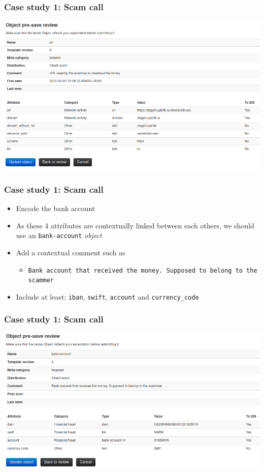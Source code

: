 \begin{frame}
    \frametitle{Case study 1: Scam call}
    \begin{center}
        \includegraphics[width=1.0\linewidth]{pictures/case1/object-url.png}
    \end{center}
\end{frame}

\begin{frame}
    \frametitle{Case study 1: Scam call}
    \begin{itemize}
        \item Encode the bank account
        \item As these 4 attributes are contextually linked between each others, we should use an \texttt{bank-account} \textit{object}
        \item Add a contextual comment such as
        \begin{itemize}
            \item \texttt{Bank account that received the money. Supposed to belong to the scammer}
        \end{itemize}
        \item Include at least: \texttt{iban}, \texttt{swift}, \texttt{account} and \texttt{currency\_code}
    \end{itemize}
\end{frame}

\begin{frame}
    \frametitle{Case study 1: Scam call}
    \begin{center}
        \includegraphics[width=1.0\linewidth]{pictures/case1/object-bankaccount.png}
    \end{center}
\end{frame}

